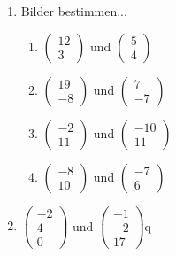 \begin{enumerate}
    \item Bilder bestimmen...
    \begin{enumerate}
        \item \( \begin{pmatrix} 12 \\ 3 \end{pmatrix} \) und \( \begin{pmatrix} 5 \\ 4 \end{pmatrix} \)
        \item \( \begin{pmatrix} 19 \\ -8 \end{pmatrix} \) und \( \begin{pmatrix} 7 \\ -7 \end{pmatrix} \)
        \item \( \begin{pmatrix} -2 \\ 11 \end{pmatrix} \) und \( \begin{pmatrix} -10 \\ 11 \end{pmatrix} \)
        \item \( \begin{pmatrix} -8 \\ 10 \end{pmatrix} \) und \( \begin{pmatrix} -7 \\ 6 \end{pmatrix} \)
       
    \end{enumerate}
     \item \( \begin{pmatrix} -2 \\ 4 \\ 0 \end{pmatrix} \) und \( \begin{pmatrix} -1 \\ -2 \\ 17 \end{pmatrix} \)q


\end{enumerate}
